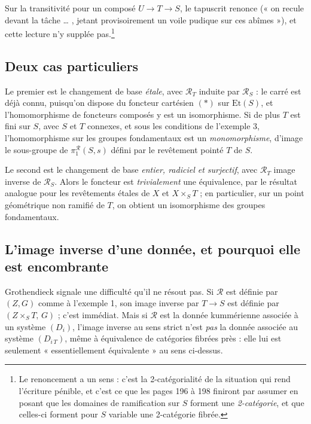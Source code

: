 \documentclass[11pt,a4paper]{article}
\begin{document}
Sur la transitivité pour un composé $U \to T \to S$, le tapuscrit renonce
(« on recule devant la tâche … , jetant provisoirement un voile pudique sur
ces abîmes »), et cette lecture n'y supplée pas.\footnote{Le renoncement a un
sens : c'est la 2-catégorialité de la situation qui
rend l'écriture pénible, et c'est ce que les pages 196 à 198
finiront par assumer en posant que les domaines de ramification sur $S$ forment
une \emph{2-catégorie}, et que celles-ci forment pour $S$ variable une
2-catégorie fibrée.}

\subsection*{Deux cas particuliers}

Le premier est le changement de base \emph{étale}, avec $\mathcal{R}_{T}$
induite par $\mathcal{R}_{S}$ : le carré est déjà connu, puisqu'on dispose du
foncteur cartésien $(\ast)$ sur $\mathrm{Et}(S)$, et l'homomorphisme de
foncteurs composés y est un isomorphisme. Si de plus $T$ est fini sur $S$, avec
$S$ et $T$ connexes, et sous les conditions de l'exemple 3, l'homomorphisme sur
les groupes fondamentaux est un \emph{monomorphisme}, d'image le sous-groupe de
$\pi_{1}^{\mathcal{R}}(S,s)$ défini par le revêtement pointé $T$ de $S$.

Le second est le changement de base \emph{entier, radiciel et surjectif}, avec
$\mathcal{R}_{T}$ image inverse de $\mathcal{R}_{S}$. Alors le foncteur est
\emph{trivialement} une équivalence, par le résultat analogue pour les
revêtements étales de $X$ et $X \times_{S} T$ ; en particulier, sur un point
géométrique non ramifié de $T$, on obtient un isomorphisme des groupes
fondamentaux.

\subsection*{L'image inverse d'une donnée, et pourquoi elle est encombrante}

Grothendieck signale une difficulté qu'il ne résout pas. Si $\mathcal{R}$ est
définie par $(Z,G)$ comme à l'exemple 1, son image inverse par $T \to S$ est
définie par $(Z \times_{S} T,\, G)$ ; c'est immédiat. Mais si $\mathcal{R}$ est
la donnée kummérienne associée à un système $(D_{i})$, l'image inverse au sens
strict n'est \emph{pas} la donnée associée au système $(D_{i\,T})$, même à
équivalence de catégories fibrées près : elle lui est seulement
« essentiellement équivalente » au sens ci-dessus.
\end{document}
